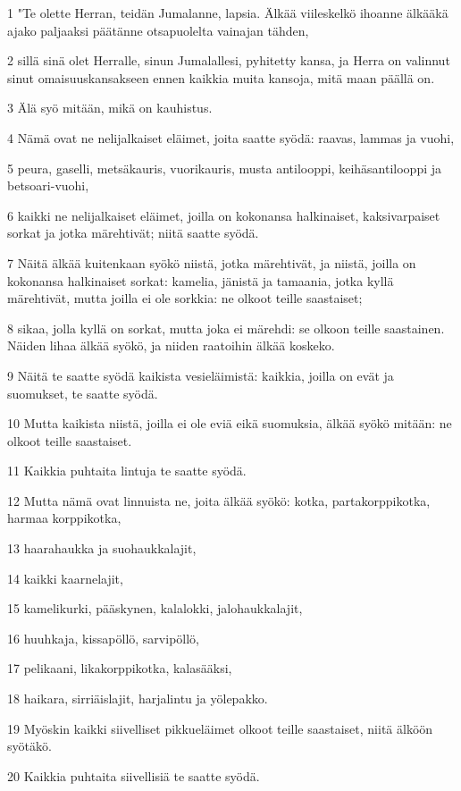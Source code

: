 \par 1 "Te olette Herran, teidän Jumalanne, lapsia. Älkää viileskelkö ihoanne älkääkä ajako paljaaksi päätänne otsapuolelta vainajan tähden,
\par 2 sillä sinä olet Herralle, sinun Jumalallesi, pyhitetty kansa, ja Herra on valinnut sinut omaisuuskansakseen ennen kaikkia muita kansoja, mitä maan päällä on.
\par 3 Älä syö mitään, mikä on kauhistus.
\par 4 Nämä ovat ne nelijalkaiset eläimet, joita saatte syödä: raavas, lammas ja vuohi,
\par 5 peura, gaselli, metsäkauris, vuorikauris, musta antilooppi, keihäsantilooppi ja betsoari-vuohi,
\par 6 kaikki ne nelijalkaiset eläimet, joilla on kokonansa halkinaiset, kaksivarpaiset sorkat ja jotka märehtivät; niitä saatte syödä.
\par 7 Näitä älkää kuitenkaan syökö niistä, jotka märehtivät, ja niistä, joilla on kokonansa halkinaiset sorkat: kamelia, jänistä ja tamaania, jotka kyllä märehtivät, mutta joilla ei ole sorkkia: ne olkoot teille saastaiset;
\par 8 sikaa, jolla kyllä on sorkat, mutta joka ei märehdi: se olkoon teille saastainen. Näiden lihaa älkää syökö, ja niiden raatoihin älkää koskeko.
\par 9 Näitä te saatte syödä kaikista vesieläimistä: kaikkia, joilla on evät ja suomukset, te saatte syödä.
\par 10 Mutta kaikista niistä, joilla ei ole eviä eikä suomuksia, älkää syökö mitään: ne olkoot teille saastaiset.
\par 11 Kaikkia puhtaita lintuja te saatte syödä.
\par 12 Mutta nämä ovat linnuista ne, joita älkää syökö: kotka, partakorppikotka, harmaa korppikotka,
\par 13 haarahaukka ja suohaukkalajit,
\par 14 kaikki kaarnelajit,
\par 15 kamelikurki, pääskynen, kalalokki, jalohaukkalajit,
\par 16 huuhkaja, kissapöllö, sarvipöllö,
\par 17 pelikaani, likakorppikotka, kalasääksi,
\par 18 haikara, sirriäislajit, harjalintu ja yölepakko.
\par 19 Myöskin kaikki siivelliset pikkueläimet olkoot teille saastaiset, niitä älköön syötäkö.
\par 20 Kaikkia puhtaita siivellisiä te saatte syödä.
